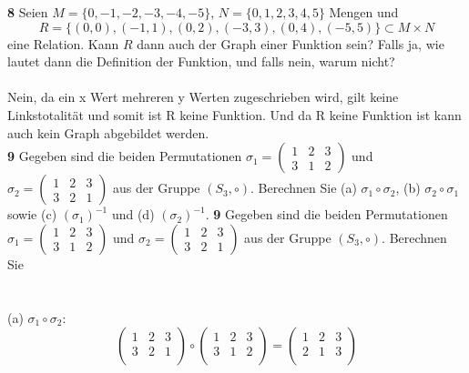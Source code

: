 \documentclass[11pt]{article}
\begin{document}
{{    \textbf{8} Seien $ M = \{0,-1,-2,-3,-4,-5\} $, $ N = \{0,1,2,3,4,5\} $ Mengen und
    \[ R = \{(0,0),(-1,1),(0,2),(-3,3),(0,4),(-5,5)\} \subset M \times N \]
    eine Relation. Kann $ R $ dann auch der Graph einer Funktion sein? Falls ja, wie lautet dann die Definition der Funktion, und falls nein, warum nicht?\\\\
    Nein, da ein x Wert mehreren y Werten zugeschrieben wird, gilt keine Linkstotalität und somit ist R keine Funktion. Und da R keine Funktion ist kann auch kein Graph abgebildet werden.\\

    \textbf{9} Gegeben sind die beiden Permutationen $\sigma_{1} = \begin{pmatrix} 1 & 2 & 3 \\ 3 & 1 & 2 \end{pmatrix}$ und $\sigma_{2} = \begin{pmatrix} 1 & 2 & 3 \\ 3 & 2 & 1 \end{pmatrix}$ aus der Gruppe $ (S_3, \circ) $. Berechnen Sie (a) $\sigma_{1} \circ \sigma_{2}$, (b) $\sigma_{2} \circ \sigma_{1}$ sowie (c) $(\sigma_{1})^{-1}$ und (d) $(\sigma_{2})^{-1}$.
\textbf{9} Gegeben sind die beiden Permutationen $\sigma_{1} = \begin{pmatrix} 1 & 2 & 3 \\ 3 & 1 & 2 \end{pmatrix}$ und $\sigma_{2} = \begin{pmatrix} 1 & 2 & 3 \\ 3 & 2 & 1 \end{pmatrix}$ aus der Gruppe $ (S_3, \circ) $. Berechnen Sie
\\\\\\
(a) $\sigma_{1} \circ \sigma_{2}$:
    \[
        \begin{pmatrix}
            1 & 2 & 3 \\
            3 & 2 & 1 \\
        \end{pmatrix}
        \circ
        \begin{pmatrix}
            1 & 2 & 3 \\
            3 & 1 & 2 \\
        \end{pmatrix}
        =
        \begin{pmatrix}
            1 & 2 & 3 \\
            2 & 1 & 3 \\
        \end{pmatrix}
    \]


}}
\end{document}
